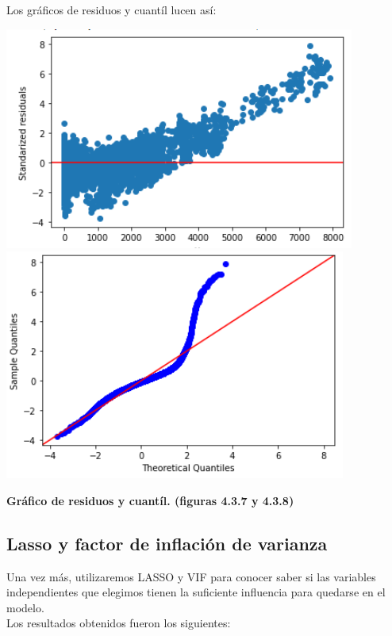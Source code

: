 \documentclass{article}
\begin{document}
    
        Los gráficos de residuos y cuantíl lucen así: 
    
            \includegraphics[scale=0.6]{images/residuos-discharge-OLS1.PNG} 
            \includegraphics[scale=0.6]{images/residuos-discharge-quantil4.PNG} \\
            \begin{center}
                \textbf{Gráfico de residuos y cuantíl. (figuras 4.3.7 y 4.3.8)}
            \end{center}


 
    \subsection{Lasso y  factor de inflación de varianza}
        
        Una vez más, utilizaremos LASSO y VIF para conocer saber si las variables independientes que elegimos tienen la suficiente influencia para quedarse en el modelo.\\
        
        Los resultados obtenidos fueron los siguientes:\\
        
\end{document}
